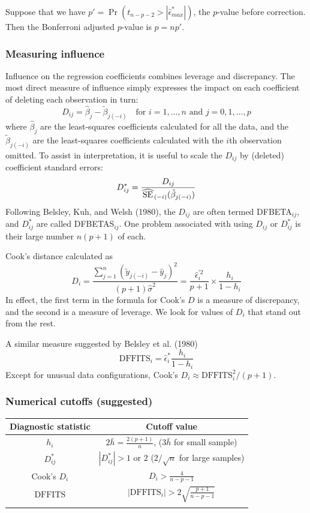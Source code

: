 Suppose that we have $p' = \Pr(t_{n - p - 2} > |\hat{\epsilon}_{max}^{*}|)$, the $p$-value before correction.
Then the Bonferroni adjusted $p$-value is $p = n p'$.


\subsubsection*{Measuring influence}
Influence on the regression coefficients combines leverage and discrepancy.
The most direct measure of influence simply expresses the impact on each coefficient of deleting each observation in turn:
$$
D_{ij} = \hat{\beta}_j - \tilde{\beta}_{j(-i)} \quad \mbox{for } i=1, \dots, n \mbox{ and } j=0, 1, \dots, p
$$
where $\hat{\beta}_j$ are the least-squares coefficients calculated for all the data, and the $\tilde{\beta}_{j(-i)}$ are the least-squares coefficients calculated with the $i$th observation omitted.
To assist in interpretation, it is useful to scale the $D_{ij}$ by (deleted) coefficient standard errors:
$$
D_{ij}^* = \frac{D_{ij}}{\reallywidehat{SE}_{(-i)} (\tilde{\beta}_{j(-i)})}
$$
Following Belsley, Kuh, and Welsh (1980), the $D_{ij}$ are often termed DFBETA$_{ij}$, and $D_{ij}^*$ are called DFBETAS$_{ij}$.
One problem associated with using $D_{ij}$ or  $D_{ij}^*$ is their large number $n(p+1)$ of each.

Cook's distance calculated as
$$
D_i = \frac{\sum_{j = 1}^n(\tilde{y}_{j(-i)} - \hat{y}_j )^2}{(p + 1) \hat{\sigma}^2 } = \frac{\hat{\epsilon}_i^{'2} }{p + 1} \times \frac{h_i}{1 - h_i}
$$
In effect, the first term in the formula for Cook's $D$ is a measure of discrepancy, and the second is a measure of leverage.
We look for values of $D_i$ that stand out from the rest.

A similar measure suggested by Belsley et al. (1980)
$$
\mbox{DFFITS}_i = \hat{\epsilon}_i^{*} \frac{h_i}{1 - h_i}
$$
Except for unusual data configurations, Cook's $D_i \approx \mbox{DFFITS}_i^2/(p + 1)$.

\subsubsection*{Numerical cutoffs (suggested)}

\begin{center}
\begin{tabular}{ c c}
\hline
Diagnostic statistic & Cutoff value\\
\hline
$h_i$ & $ 2 \bar{h} =  \frac{2(p + 1)}{n}$, ($3\bar{h}$ for small sample)\\
$D_{ij}^*$ & $|D_{ij}^*| > 1$ or $2$ ($2/\sqrt{n}$ for large samples)\\
Cook's $D_i$ & $D_i > \frac{4}{n - p -1}$\\
$\mbox{DFFITS}$ & $|\mbox{DFFITS}_i| > 2 \sqrt{ \frac{p + 1}{n - p - 1}}$ \\
\hline
\label{table:distributions}
\end{tabular}
\end{center}







